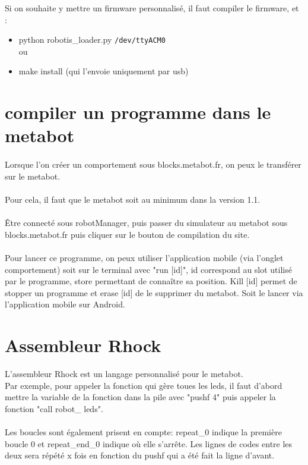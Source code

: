 \documentclass[10pt,a4paper]{report}
\begin{document}
Si on souhaite y mettre un firmware personnalisé, il faut compiler le firmware, et :
\begin{itemize}
\item python robotis\_loader.py \texttt{/dev/ttyACM0}
\\ou
\item make install (qui l'envoie uniquement par usb)
\end{itemize}

\section{compiler un programme dans le metabot}
\paragraph{}
Lorsque l'on créer un comportement sous blocks.metabot.fr, on peux le transférer sur le metabot.
\paragraph{}
Pour cela, il faut que le metabot soit au minimum dans la version 1.1.
\paragraph{}
Être connecté sous robotManager, puis passer du simulateur au metabot sous blocks.metabot.fr puis cliquer sur le bouton de compilation du site.
\paragraph{}
Pour lancer ce programme, on peux utiliser l'application mobile (via l'onglet comportement) soit sur le terminal avec "run [id]", id correspond au slot utilisé par le programme, store permettant de connaître sa position. Kill [id] permet de stopper un programme et erase [id] de le supprimer du metabot.
Soit le lancer via l'application mobile sur Android.

\section{Assembleur Rhock}
L'assembleur Rhock est un langage personnalisé pour le metabot.\\
Par exemple, pour appeler la fonction qui gère toues les  leds, il faut d'abord mettre la variable de la fonction dans la pile avec "pushf 4" puis appeler la fonction "call robot\_ leds".
\paragraph{}
Les boucles sont également prisent en compte: repeat\_0 indique la première boucle 0 et repeat\_end\_0 indique où elle s'arrête. Les lignes de codes entre les deux sera répété x fois en fonction du pushf qui a été fait la ligne d'avant.
\end{document}
